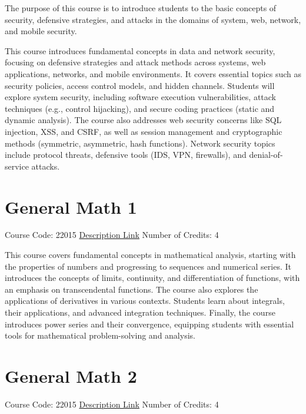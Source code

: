 \documentclass[
fontsize=11pt,
paper=a4,
parskip=half,
enlargefirstpage=off,    %
fromalign=right,        %
fromphone=on,           %
fromemail=on,
fromrule=off,           %
addrfield=off,          %
backaddress=on,         %
subject=beforeopening,  %
locfield=narrow,        %
foldmarks=off,          %
open=any
]{scrartcl}
\begin{document}
The purpose of this course is to introduce students to the basic concepts of security, defensive strategies, and attacks in the domains of system, web, network, and mobile security.

This course introduces fundamental concepts in data and network security, focusing on defensive strategies and attack methods across systems, web applications, networks, and mobile environments. It covers essential topics such as security policies, access control models, and hidden channels. Students will explore system security, including software execution vulnerabilities, attack techniques (e.g., control hijacking), and secure coding practices (static and dynamic analysis). The course also addresses web security concerns like SQL injection, XSS, and CSRF, as well as session management and cryptographic methods (symmetric, asymmetric, hash functions). Network security topics include protocol threats, defensive tools (IDS, VPN, firewalls), and denial-of-service attacks.

\section{General Math 1}
Course Code: 22015 \qquad \quad \href{https://docs.ce.sharif.edu/course/22015}{Description Link}
\qquad \quad Number of Credits: 4

This course covers fundamental concepts in mathematical analysis, starting with the properties of numbers and progressing to sequences and numerical series. It introduces the concepts of limits, continuity, and differentiation of functions, with an emphasis on transcendental functions. The course also explores the applications of derivatives in various contexts. Students learn about integrals, their applications, and advanced integration techniques. Finally, the course introduces power series and their convergence, equipping students with essential tools for mathematical problem-solving and analysis.

\section{General Math 2}
Course Code: 22015 \qquad \quad \href{https://docs.ce.sharif.edu/course/22015}{Description Link}
\qquad \quad Number of Credits: 4
\end{document}
